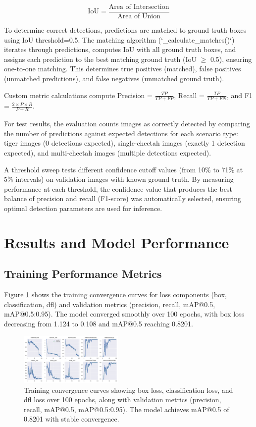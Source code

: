 \documentclass[conference]{IEEEtran}
\begin{document}
$$\text{IoU} = \frac{\text{Area of Intersection}}{\text{Area of Union}}$$

To determine correct detections, predictions are matched to ground truth boxes using IoU threshold=0.5. The matching algorithm (`\_calculate\_matches()`) iterates through predictions, computes IoU with all ground truth boxes, and assigns each prediction to the best matching ground truth (IoU $\geq$ 0.5), ensuring one-to-one matching. This determines true positives (matched), false positives (unmatched predictions), and false negatives (unmatched ground truth).

Custom metric calculations compute Precision = $\frac{TP}{TP + FP}$, Recall = $\frac{TP}{TP + FN}$, and F1 = $\frac{2 \times P \times R}{P + R}$.

For test results, the evaluation counts images as correctly detected by comparing the number of predictions against expected detections for each scenario type: tiger images (0 detections expected), single-cheetah images (exactly 1 detection expected), and multi-cheetah images (multiple detections expected).

A threshold sweep tests different confidence cutoff values (from 10\% to 71\% at 5\% intervals) on validation images with known ground truth. By measuring performance at each threshold, the confidence value that produces the best balance of precision and recall (F1-score) was automatically selected, ensuring optimal detection parameters are used for inference.

\section{Results and Model Performance}

\subsection{Training Performance Metrics}

Figure \ref{fig:training_results} shows the training convergence curves for loss components (box, classification, dfl) and validation metrics (precision, recall, mAP@0.5, mAP@0.5:0.95). The model converged smoothly over 100 epochs, with box loss decreasing from 1.124 to 0.108 and mAP@0.5 reaching 0.8201.

\begin{figure}[htbp]
\centerline{\includegraphics[width=0.45\textwidth]{training_results.png}}
\caption{Training convergence curves showing box loss, classification loss, and dfl loss over 100 epochs, along with validation metrics (precision, recall, mAP@0.5, mAP@0.5:0.95). The model achieves mAP@0.5 of 0.8201 with stable convergence.}
\label{fig:training_results}
\end{figure}
\end{document}
